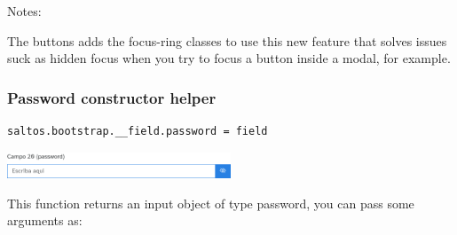\documentclass[a4paper]{article}
\begin{document}
Notes:

The buttons adds the focus-ring classes to use this new feature that solves issues suck as
hidden focus when you try to focus a button inside a modal, for example.

\hypertarget{toc68}{}
\subsubsection{Password constructor helper}

\begin{lstlisting}
saltos.bootstrap.__field.password = field
\end{lstlisting}

\begin{center}\includegraphics[width=0.5\textwidth]{../ujest/snaps/test-bootstrap-js-bootstrap-campo-20-password-1-snap.png}\end{center}

This function returns an input object of type password, you can pass some arguments as:
\end{document}
